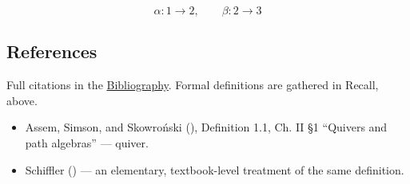 \[
\alpha : 1 \to 2, \qquad \beta : 2 \to 3
\]

\subsection{References}\label{sec:11-path-algebras:01-what-is-a-quiver:4}

Full citations in the \hyperref[sec:root:bibliography:1]{Bibliography}. Formal definitions are gathered in Recall, above.

\begin{itemize}
\tightlist
\item
  Assem, Simson, and Skowroński (\cite{AssemSimsonSkowronski2006}), Definition 1.1, Ch. II §1 ``Quivers and path algebras'' --- quiver.
\item
  Schiffler (\cite{Schiffler2014}) --- an elementary, textbook-level treatment of the same definition.
\end{itemize}
